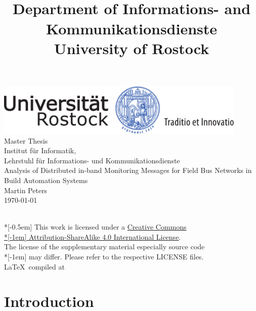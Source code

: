 \documentclass[12pt, a4paper, titlepage]{book}
\title{\thetitle\\[24pt]
	\small Department of \alert{Informations- and Kommunikationsdienste}\\[-3pt]
	\small University of Rostock}
\author{\theauthor}
\date{\thedate}
\newcommand{\alert}[1]{{\color{red}#1}}
\newcommand{\thedate}{\today}
\newcommand{\theauthor}{Martin Peters}
\newcommand{\thetitle}{Analysis of Distributed in-band Monitoring Messages for Field Bus Networks in Build Automation Systems}
\begin{document}
	\begin{titlepage}
		\centering
		\includegraphics[width=0.9\textwidth]{style/UNI-Logo_Siegel_4c_115mm.pdf}
		\\[1.3cm]
		{\Huge Master Thesis}\\[0.5cm]
		{\large\alert{ Institut für Informatik,\\Lehrstuhl für Informations- und Kommunikationsdienste}}
		\\[3.5cm]
		{\Huge \thetitle}
		\\[2cm]
		{\large\theauthor\\[0.5cm]\thedate}
	\end{titlepage}
	~ \vfill
	{
		\tiny \noindent
		{\normalsize \href{http://creativecommons.org/licenses/by-sa/4.0/}{\ccbysa}} \\*[-0.5em]
		This work is licensed under a \href{http://creativecommons.org/licenses/by-sa/4.0/}{Creative Commons\\*[-1em] Attribution-ShareAlike 4.0 International License}. \\
		The license of the supplementary material especially source code\\*[-1em]
		may differ. Please refer to the respective LICENSE files.\\
		\LaTeX ~compiled at \DTMnow
	}
	\pagebreak
	\clearpage
	\setcounter{page}{1}
	\tableofcontents
	\listoffigures
	
	\newpage
	
	\chapter{Introduction}
	\label{sec:intro}
	
	
\end{document}
